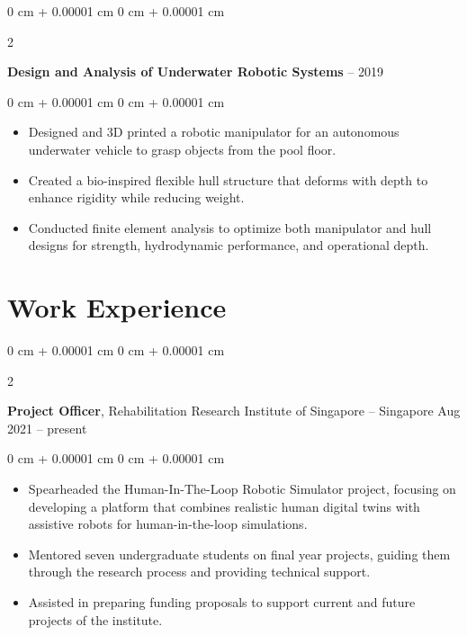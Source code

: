 \documentclass[10pt, letterpaper]{article}
\newenvironment{highlights}{
    \begin{itemize}[
        topsep=0.10 cm,
        parsep=0.10 cm,
        partopsep=0pt,
        itemsep=0pt,
        leftmargin=0 cm + 10pt
    ]
}{
    \end{itemize}
} %
\newenvironment{onecolentry}{
    \begin{adjustwidth}{
        0 cm + 0.00001 cm
    }{
        0 cm + 0.00001 cm
    }
}{
    \end{adjustwidth}
} %
\newenvironment{twocolentry}[2][]{
    \onecolentry
    \def\secondColumn{#2}
    \setcolumnwidth{\fill, 4.5 cm}
    \begin{paracol}{2}
}{
    \switchcolumn \raggedleft \secondColumn
    \end{paracol}
    \endonecolentry
} %
\begin{document}
        \vspace{0.2 cm}

        \begin{twocolentry}{
            2018 -- 2019
        }
            \textbf{Design and Analysis of Underwater Robotic Systems}\end{twocolentry}

        \vspace{0.10 cm}
        \begin{onecolentry}
            \begin{highlights}
                \item Designed and 3D printed a robotic manipulator for an autonomous underwater vehicle to grasp objects from the pool floor.
                \item Created a bio-inspired flexible hull structure that deforms with depth to enhance rigidity while reducing weight.
                \item Conducted finite element analysis to optimize both manipulator and hull designs for strength, hydrodynamic performance, and operational depth.
            \end{highlights}
        \end{onecolentry}



    
    \section{Work Experience}



        
        \begin{twocolentry}{
            Aug 2021 – present
        }
            \textbf{Project Officer}, Rehabilitation Research Institute of Singapore -- Singapore\end{twocolentry}

        \vspace{0.10 cm}
        \begin{onecolentry}
            \begin{highlights}
                \item Spearheaded the Human-In-The-Loop Robotic Simulator project, focusing on developing a platform that combines realistic human digital twins with assistive robots for human-in-the-loop simulations.
                \item Mentored seven undergraduate students on final year projects, guiding them through the research process and providing technical support.
                \item Assisted in preparing funding proposals to support current and future projects of the institute.
            \end{highlights}
        \end{onecolentry}
\end{document}
